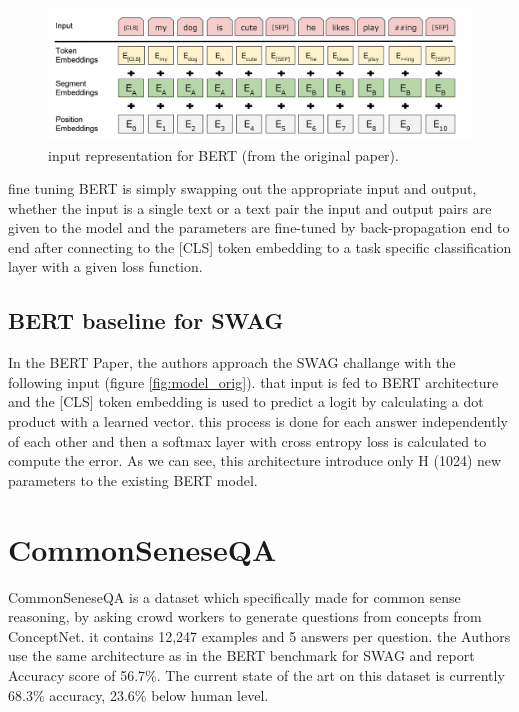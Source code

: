 \documentclass{article}
\begin{document}
\begin{figure}[ht]
\vskip 0.2in
\begin{center}
\centerline{\includegraphics[width=\columnwidth]{bert_input_repr}}
\caption{input representation for BERT (from the original paper).}
\label{bert_input_repr}
\end{center}
\vskip -0.2in
\end{figure}
fine tuning BERT is simply swapping out the appropriate input and output, whether the input is a single text or a text pair the input and output pairs are given to the model and the parameters are fine-tuned by back-propagation end to end after connecting to the [CLS] token embedding to a task specific classification layer with a given loss function. 

\subsection{BERT baseline for SWAG}

In the BERT Paper, the authors approach the SWAG challange with the following input (figure \ref{fig:model_orig}). that input is fed to BERT architecture and the [CLS] token embedding is used to predict a logit by calculating a dot product with a learned vector. this process is done for each answer independently of each other and then a softmax layer with cross entropy loss is calculated to compute the error. As we can see, this architecture introduce only H (1024) new parameters to the existing BERT model.



\section{CommonSeneseQA}
CommonSeneseQA is a dataset which specifically made for common sense reasoning, by asking crowd workers to generate questions from concepts from ConceptNet. it contains 12,247 examples and 5 answers per question. 
the Authors use the same architecture as in the BERT benchmark for SWAG
and report Accuracy score of 56.7\%. The current state of the art
on this dataset is currently 68.3\% accuracy, 23.6\% below human level.
\end{document}
